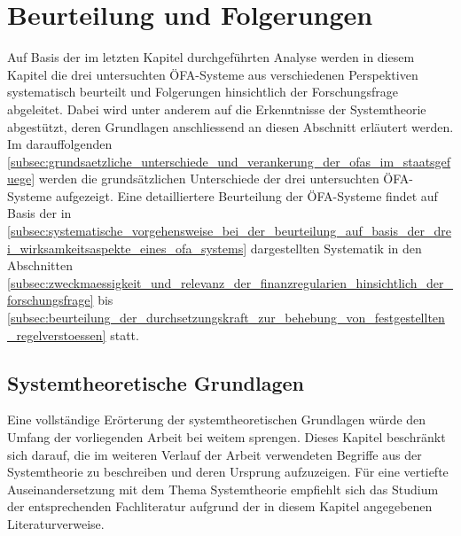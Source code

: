 \documentclass[10pt]{article}
\begin{document}
\section{Beurteilung und Folgerungen}\label{sec:beurteilung_und_folgerungen}
Auf Basis der im letzten Kapitel durchgeführten Analyse werden in diesem Kapitel die drei untersuchten ÖFA-Systeme aus verschiedenen Perspektiven systematisch beurteilt und Folgerungen hinsichtlich der Forschungsfrage abgeleitet. Dabei wird unter anderem auf die Erkenntnisse der Systemtheorie abgestützt, deren Grundlagen anschliessend an diesen Abschnitt erläutert werden. Im darauffolgenden \vref{subsec:grundsaetzliche_unterschiede_und_verankerung_der_ofas_im_staatsgefuege} werden die grundsätzlichen Unterschiede der drei untersuchten ÖFA-Systeme aufgezeigt. Eine detailliertere Beurteilung der ÖFA-Systeme findet auf Basis der in \vref{subsec:systematische_vorgehensweise_bei_der_beurteilung_auf_basis_der_drei_wirksamkeitsaspekte_eines_ofa_systems} dargestellten Systematik in den Abschnitten \ref{subsec:zweckmaessigkeit_und_relevanz_der_finanzregularien_hinsichtlich_der_forschungsfrage} bis \ref{subsec:beurteilung_der_durchsetzungskraft_zur_behebung_von_festgestellten_regelverstoessen} statt.

\subsection{Systemtheoretische Grundlagen}\label{subsec:systemtheoretische_grundlagen}
Eine vollständige Erörterung der systemtheoretischen Grundlagen würde den Umfang der vorliegenden Arbeit bei weitem sprengen. Dieses Kapitel beschränkt sich darauf, die im weiteren Verlauf der Arbeit verwendeten Begriffe aus der Systemtheorie zu beschreiben und deren Ursprung aufzuzeigen. Für eine vertiefte Auseinander­setzung mit dem Thema Systemtheorie empfiehlt sich das Studium der entsprechenden Fachliteratur aufgrund der in diesem Kapitel angegebenen Literaturverweise.
\end{document}
